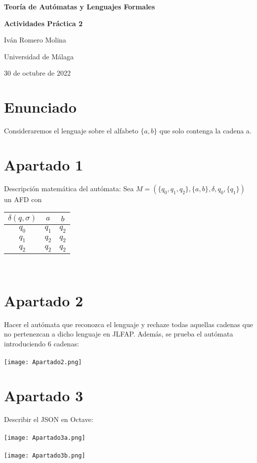 \documentclass[16]{article} %
\begin{document}
\begin{titlepage} %
	\centering  %
	{\bfseries\Huge Teoría de Autómatas y Lenguajes Formales\par}
   	\vspace{2cm} %
    {\bfseries\huge Actividades Práctica 2\par}
    \vfill %
    {\huge Iván Romero Molina\par}
    \vspace{1cm}
    {\Large Universidad de Málaga\par}
    \vspace{1cm}
    {\large 30 de octubre de 2022\par}
\end{titlepage}
    
\newpage
\section*{\huge Enunciado}
\noindent %
Consideraremos el lenguaje sobre el alfabeto $\{a, b\}$ que solo contenga la cadena a.
\section*{Apartado 1}	%
\noindent
Descripción matemática del autómata:
Sea $M=(\{q_0,q_1,q_2\}, \{a,b\}, \delta, q_0, \{q_1\})$ un AFD con
\begin{table}[h!]
	\begin{tabular}{c|c|c}
  	$\delta(q,\sigma)$ & $a$ & $b$\\
  	\hline
  	$q_0$& $q_1$ & $q_2$\\
  	\hline
  	$q_1$& $q_2$ & $q_2$\\
  	\hline
  	$q_2$& $q_2$ & $q_2$
	\end{tabular}
\end{table}
\\
\section*{Apartado 2}
\noindent
Hacer el autómata que reconozca el lenguaje y rechaze todas aquellas cadenas que no pertenezcan a dicho lenguaje en JLFAP. Además, se prueba el autómata introduciendo 6 cadenas:\\\\
\texttt{[image: Apartado2.png]}

\newpage
\section*{Apartado 3}
\noindent
Describir el JSON en Octave:\\\\
\texttt{[image: Apartado3a.png]}
\\\\
\texttt{[image: Apartado3b.png]}
\end{document}
